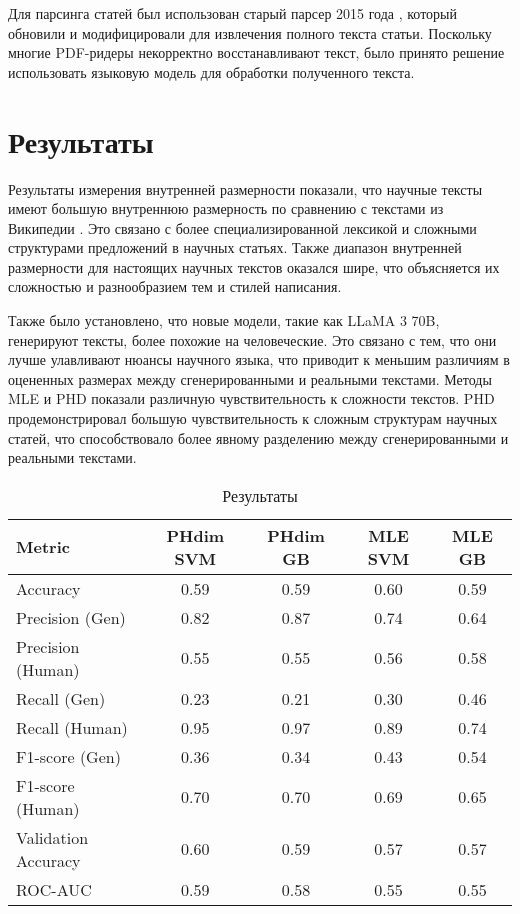 \documentclass{math-mech-sci}
\begin{document}
Для парсинга статей был использован старый парсер 2015 года \cite{fjxmlzn2023scholar}, который обновили и модифицировали для извлечения полного текста статьи. Поскольку многие PDF-ридеры некорректно восстанавливают текст, было принято решение использовать языковую модель для обработки полученного текста.

\section{Результаты}


Результаты измерения внутренней размерности показали, что научные тексты имеют большую внутреннюю размерность по сравнению с текстами из Википедии \cite{tulchinskii2023intrinsic}. Это связано с более специализированной лексикой и сложными структурами предложений в научных статьях. Также диапазон внутренней размерности для настоящих научных текстов оказался шире, что объясняется их сложностью и разнообразием тем и стилей написания.

Также было установлено, что новые модели, такие как LLaMA 3 70B, генерируют тексты, более похожие на человеческие. Это связано с тем, что они лучше улавливают нюансы научного языка, что приводит к меньшим различиям в оцененных размерах между сгенерированными и реальными текстами. Методы MLE и PHD показали различную чувствительность к сложности текстов. PHD продемонстрировал большую чувствительность к сложным структурам научных статей, что способствовало более явному разделению между сгенерированными и реальными текстами.


\begin{table}[h]
    \centering
    \begin{tabular}{lcccc}
        \toprule
        \textbf{Metric} & \textbf{PHdim SVM} & \textbf{PHdim GB} & \textbf{MLE SVM} & \textbf{MLE GB} \\
        \midrule
        Accuracy & 0.59 & 0.59 & 0.60 & 0.59 \\
        Precision (Gen) & 0.82 & 0.87 & 0.74 & 0.64 \\
        Precision (Human) & 0.55 & 0.55 & 0.56 & 0.58 \\
        Recall (Gen) & 0.23 & 0.21 & 0.30 & 0.46 \\
        Recall (Human) & 0.95 & 0.97 & 0.89 & 0.74 \\
        F1-score (Gen) & 0.36 & 0.34 & 0.43 & 0.54 \\
        F1-score (Human) & 0.70 & 0.70 & 0.69 & 0.65 \\
        Validation Accuracy & 0.60 & 0.59 & 0.57 & 0.57 \\
        ROC-AUC & 0.59 & 0.58 & 0.55 & 0.55 \\
        \bottomrule
    \end{tabular}
    \caption{Результаты}
\end{table}
\end{document}
